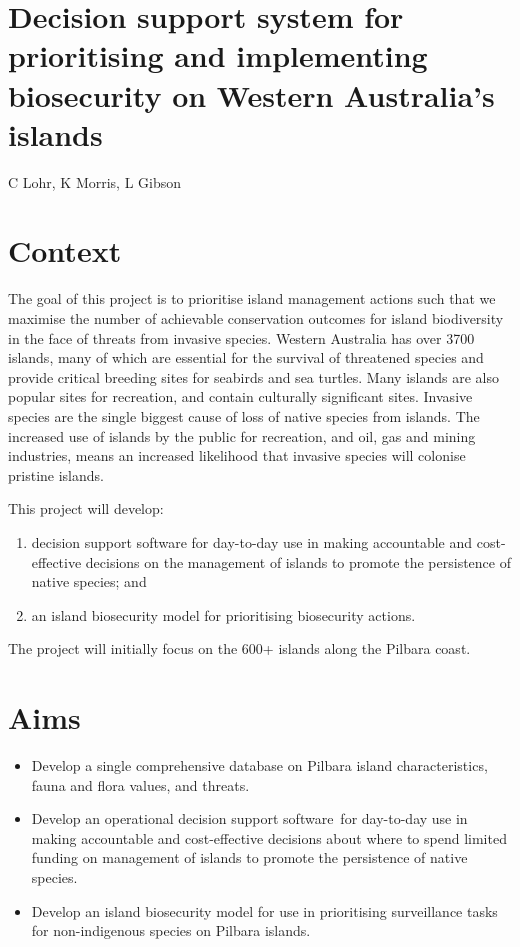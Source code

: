 \documentclass[version=last,
    paper=a4, %
    10pt, %
    usenames,
    dvipsnames,
    oneside, %
    headings=openany, %
    DIV=15 %
]{scrbook}
\begin{document}
\section*{Decision support system for prioritising and implementing biosecurity on
Western Australia's islands
}

C Lohr, K Morris, L Gibson



\section*{Context}

The goal of this project is to prioritise island management actions such
that we maximise the number of achievable conservation outcomes for
island biodiversity in the face of threats from invasive species.
Western Australia has over 3700 islands, many of which are essential for
the survival of threatened species and provide critical breeding sites
for seabirds and sea turtles. Many islands are also popular sites for
recreation, and contain culturally significant sites. Invasive species
are the single biggest cause of loss of native species from islands. The
increased use of islands by the public for recreation, and oil, gas and
mining industries, means an increased likelihood that invasive species
will colonise pristine islands.

This project will develop:

\begin{enumerate}
\itemsep1pt\parskip0pt
\item
  decision support software for day-to-day use in making accountable and
  cost-effective decisions on the management of islands to promote the
  persistence of native species; and
\item
  an island biosecurity model for prioritising biosecurity actions.
\end{enumerate}

The project will initially focus on the 600+ islands along the Pilbara
coast.




\section*{Aims}

\begin{itemize}
\itemsep1pt\parskip0pt
\item
  Develop a single comprehensive database on Pilbara island
  characteristics, fauna and flora values, and threats.
\item
  Develop an operational decision support software~for day-to-day use in
  making accountable and cost-effective decisions about where to spend
  limited funding on management of islands to promote the persistence of
  native species.
\item
  Develop an island biosecurity model for use in prioritising
  surveillance tasks for non-indigenous species on Pilbara islands.
\end{itemize}
\end{document}
